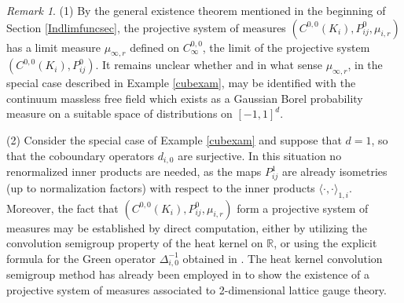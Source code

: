 \documentclass[11pt,reqno]{amsart}
\numberwithin{equation}{section}
\theoremstyle{remark}
\newtheorem{remark}[theorem]{Remark}
\theoremstyle{rmdefinition}
\begin{document}
\begin{remark}
(1) By the general existence theorem mentioned in the beginning of Section \ref{Indlimfuncsec}, the projective system of measures $(C^{0,0}(K_i),P^0_{ij},\mu_{i,r})$ has a limit measure $\mu_{\infty,r}$ defined on $C^{0,0}_{\infty}$, the limit of the projective system $(C^{0,0}(K_i),P^0_{ij})$.  It remains unclear whether and in what sense $\mu_{\infty,r}$, in the special case described in Example \ref{cubexam}, may be identified with the continuum massless free field which exists as a Gaussian Borel probability measure on a suitable space of distributions on $[-1,1]^d$.

(2) Consider the special case of Example \ref{cubexam} and suppose that  $d=1$,  so that the coboundary operators $d_{i,0}$ are surjective. In this situation 
no renormalized inner products are needed, as the maps $P^1_{ij}$ are already isometries (up to normalization factors) with respect to the inner products $\langle \cdot, \cdot \rangle_{1,i}$. Moreover, the fact that $(C^{0,0}(K_i),P^0_{ij},\mu_{i,r})$ form a projective system of measures may be established by direct computation, either by utilizing the convolution semigroup property of the heat kernel on $\mathbb{R}$, or using the explicit formula for the Green operator $\Delta^{-1}_{i,0}$ obtained in \cite[Theorem 3]{CY}. The heat kernel convolution semigroup method has already been employed in \cite{VM}  to show the existence of a projective system of measures associated to 2-dimensional lattice gauge theory.


\end{remark}
\end{document}

